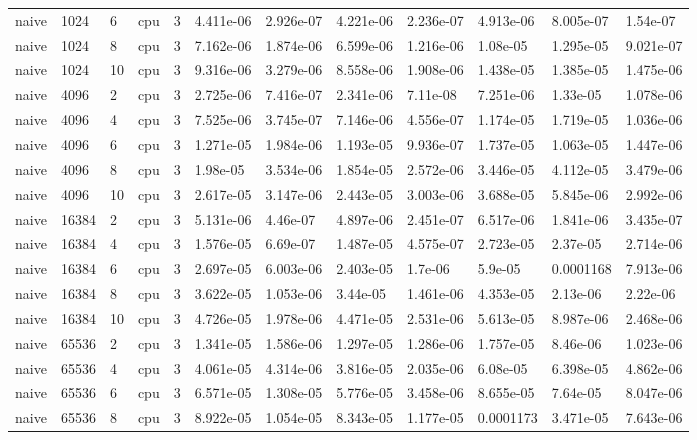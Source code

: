 \begin{tabular}{llllllllllll}
naive & 1024 & 6 & cpu & 3 & 4.411e-06 & 2.926e-07 & 4.221e-06 & 2.236e-07 & 4.913e-06 & 8.005e-07 & 1.54e-07 \\
naive & 1024 & 8 & cpu & 3 & 7.162e-06 & 1.874e-06 & 6.599e-06 & 1.216e-06 & 1.08e-05 & 1.295e-05 & 9.021e-07 \\
naive & 1024 & 10 & cpu & 3 & 9.316e-06 & 3.279e-06 & 8.558e-06 & 1.908e-06 & 1.438e-05 & 1.385e-05 & 1.475e-06 \\
naive & 4096 & 2 & cpu & 3 & 2.725e-06 & 7.416e-07 & 2.341e-06 & 7.11e-08 & 7.251e-06 & 1.33e-05 & 1.078e-06 \\
naive & 4096 & 4 & cpu & 3 & 7.525e-06 & 3.745e-07 & 7.146e-06 & 4.556e-07 & 1.174e-05 & 1.719e-05 & 1.036e-06 \\
naive & 4096 & 6 & cpu & 3 & 1.271e-05 & 1.984e-06 & 1.193e-05 & 9.936e-07 & 1.737e-05 & 1.063e-05 & 1.447e-06 \\
naive & 4096 & 8 & cpu & 3 & 1.98e-05 & 3.534e-06 & 1.854e-05 & 2.572e-06 & 3.446e-05 & 4.112e-05 & 3.479e-06 \\
naive & 4096 & 10 & cpu & 3 & 2.617e-05 & 3.147e-06 & 2.443e-05 & 3.003e-06 & 3.688e-05 & 5.845e-06 & 2.992e-06 \\
naive & 16384 & 2 & cpu & 3 & 5.131e-06 & 4.46e-07 & 4.897e-06 & 2.451e-07 & 6.517e-06 & 1.841e-06 & 3.435e-07 \\
naive & 16384 & 4 & cpu & 3 & 1.576e-05 & 6.69e-07 & 1.487e-05 & 4.575e-07 & 2.723e-05 & 2.37e-05 & 2.714e-06 \\
naive & 16384 & 6 & cpu & 3 & 2.697e-05 & 6.003e-06 & 2.403e-05 & 1.7e-06 & 5.9e-05 & 0.0001168 & 7.913e-06 \\
naive & 16384 & 8 & cpu & 3 & 3.622e-05 & 1.053e-06 & 3.44e-05 & 1.461e-06 & 4.353e-05 & 2.13e-06 & 2.22e-06 \\
naive & 16384 & 10 & cpu & 3 & 4.726e-05 & 1.978e-06 & 4.471e-05 & 2.531e-06 & 5.613e-05 & 8.987e-06 & 2.468e-06 \\
naive & 65536 & 2 & cpu & 3 & 1.341e-05 & 1.586e-06 & 1.297e-05 & 1.286e-06 & 1.757e-05 & 8.46e-06 & 1.023e-06 \\
naive & 65536 & 4 & cpu & 3 & 4.061e-05 & 4.314e-06 & 3.816e-05 & 2.035e-06 & 6.08e-05 & 6.398e-05 & 4.862e-06 \\
naive & 65536 & 6 & cpu & 3 & 6.571e-05 & 1.308e-05 & 5.776e-05 & 3.458e-06 & 8.655e-05 & 7.64e-05 & 8.047e-06 \\
naive & 65536 & 8 & cpu & 3 & 8.922e-05 & 1.054e-05 & 8.343e-05 & 1.177e-05 & 0.0001173 & 3.471e-05 & 7.643e-06 \\

\end{tabular}
